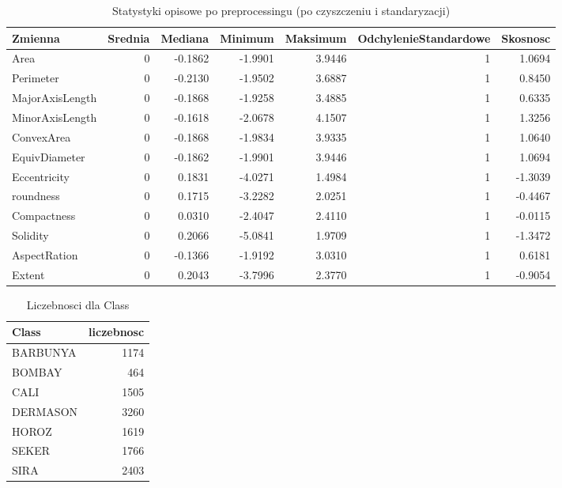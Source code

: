 \begin{table}

\caption{Statystyki opisowe po preprocessingu (po czyszczeniu i standaryzacji)}
\centering
\begin{tabular}[t]{lrrrrrr}
\toprule
Zmienna & Srednia & Mediana & Minimum & Maksimum & OdchylenieStandardowe & Skosnosc\\
\midrule
Area & 0 & -0.1862 & -1.9901 & 3.9446 & 1 & 1.0694\\
Perimeter & 0 & -0.2130 & -1.9502 & 3.6887 & 1 & 0.8450\\
MajorAxisLength & 0 & -0.1868 & -1.9258 & 3.4885 & 1 & 0.6335\\
MinorAxisLength & 0 & -0.1618 & -2.0678 & 4.1507 & 1 & 1.3256\\
ConvexArea & 0 & -0.1868 & -1.9834 & 3.9335 & 1 & 1.0640\\
\addlinespace
EquivDiameter & 0 & -0.1862 & -1.9901 & 3.9446 & 1 & 1.0694\\
Eccentricity & 0 & 0.1831 & -4.0271 & 1.4984 & 1 & -1.3039\\
roundness & 0 & 0.1715 & -3.2282 & 2.0251 & 1 & -0.4467\\
Compactness & 0 & 0.0310 & -2.4047 & 2.4110 & 1 & -0.0115\\
Solidity & 0 & 0.2066 & -5.0841 & 1.9709 & 1 & -1.3472\\
\addlinespace
AspectRation & 0 & -0.1366 & -1.9192 & 3.0310 & 1 & 0.6181\\
Extent & 0 & 0.2043 & -3.7996 & 2.3770 & 1 & -0.9054\\
\bottomrule
\end{tabular}
\end{table}

\begin{table}

\caption{Liczebnosci dla Class}
\centering
\begin{tabular}[t]{lr}
\toprule
Class & liczebnosc\\
\midrule
BARBUNYA & 1174\\
BOMBAY & 464\\
CALI & 1505\\
DERMASON & 3260\\
HOROZ & 1619\\
\addlinespace
SEKER & 1766\\
SIRA & 2403\\
\bottomrule
\end{tabular}
\end{table}

